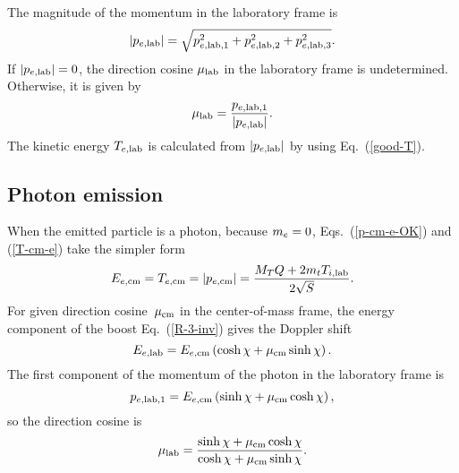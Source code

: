 {The magnitude of the momentum in the laboratory frame is
$$
  |p_{e,\textrm{lab}}| = \sqrt{ p_{e,\textrm{lab},1}^2 + p_{e,\textrm{lab},2}^2 + p_{e,\textrm{lab},3}^2 }.
$$
If $|p_{e,\textrm{lab}}| = 0$, the direction cosine $\mu_{\text{lab}}$ in the laboratory
frame is undetermined.  Otherwise, it is given by
$$
  \mu_{\text{lab}} = \frac{p_{e,\textrm{lab},1}}{|p_{e,\textrm{lab}}|}.
$$
The kinetic energy $T_{e,\textrm{lab}}$ is calculated from $|p_{e,\textrm{lab}}|$
by using Eq.~(\ref{good-T}).

\subsection{Photon emission}
When the emitted particle is a photon, because $m_e = 0$,
Eqs.~(\ref{p-cm-e-OK}) and (\ref{T-cm-e}) take the simpler form
$$
  E_{e, \textrm{cm}} = T_{e,\textrm{cm}} = |p_{e,\textrm{cm}}| =
   \frac{ M_T Q +  2m_t T_{i,\textrm{lab}} }
                {2 \sqrt{S} }.
$$
For given direction cosine~$\mu_{\text{cm}}$ in the center-of-mass frame,
the energy component of the boost Eq.~(\ref{R-3-inv}) gives the
Doppler shift
$$
   E_{e, \textrm{lab}} = E_{e, \textrm{cm}}
     \left( \cosh \chi + \mu_{\text{cm}} \sinh \chi \right).
$$
The first component of the momentum of the photon in the laboratory
frame is
$$
  p_{e,\textrm{lab},1} =  E_{e, \textrm{cm}}
     \left( \sinh \chi + \mu_{\text{cm}} \cosh \chi \right),
$$
so the direction cosine is
$$
  \mu_{\text{lab}} = \frac{\sinh \chi + \mu_{\text{cm}} \cosh \chi}
                {\cosh \chi + \mu_{\text{cm}} \sinh \chi}.
$$

\newcommand{\mayo}{m_{1,e}}
\newcommand{\mares}{m_{1,r}}
\newcommand{\mbyo}{m_{2,e}}
\newcommand{\mbres}{m_{2,r}}

\newcommand{\muacm}{\mu_{\text{1,cm}}}
\newcommand{\mubcm}{\mu_{\text{2,cm}}}
\newcommand{\mualab}{\mu_{\text{1,lab}}}
\newcommand{\mublab}{\mu_{\text{2,lab}}}

\newcommand{\Vacm}{\textbf{V}_{\text{1,cm}}}
\newcommand{\Valab}{\textbf{V}_{\text{1,lab}}}

\newcommand{\Talabe}{T_{1,e,\textrm{lab}}}
\newcommand{\Tacme}{T_{1,e,\textrm{cm}}}
\newcommand{\Tacmr}{T_{1,r,\textrm{cm}}}
\newcommand{\pacmi}{p_{1,i,\textrm{cm}}}
\newcommand{\pacme}{p_{1,e,\textrm{cm}}}
\newcommand{\pacmea}{p_{1,e,\textrm{cm},1}}
\newcommand{\pacmeb}{p_{1,e,\textrm{cm},2}}
\newcommand{\pacmec}{p_{1,e,\textrm{cm},3}}
\newcommand{\plabi}{p_{i,\textrm{lab}}}
\newcommand{\palabe}{p_{1,e,\textrm{lab}}}
\newcommand{\palabea}{p_{1,e,\textrm{lab},1}}
\newcommand{\palabeb}{p_{1,e,\textrm{lab},2}}
\newcommand{\palabec}{p_{1,e,\textrm{lab},3}}

\newcommand{\Tblabe}{T_{2,e,\textrm{lab}}}
\newcommand{\Tbcme}{T_{2,e,\textrm{cm}}}
\newcommand{\Tbcmr}{T_{2,r,\textrm{cm}}}
\newcommand{\pbcmi}{p_{2,i,\textrm{cm}}}
\newcommand{\pbcme}{p_{2,e,\textrm{cm}}}
\newcommand{\pbcmea}{p_{2,e,\textrm{cm},1}}
\newcommand{\pbcmeb}{p_{2,e,\textrm{cm},2}}
\newcommand{\pbcmec}{p_{2,e,\textrm{cm},3}}
\newcommand{\pbThetae}{p_{2,e,{\Theta_1}}}
\newcommand{\pbThetaea}{p_{2,e,{\Theta_1},1}}
\newcommand{\pbThetaeb}{p_{2,e,{\Theta_1},2}}
\newcommand{\pbThetaec}{p_{2,e,{\Theta_1},3}}
\newcommand{\pblabe}{p_{2,e,\textrm{lab}}}
\newcommand{\pblabea}{p_{2,e,\textrm{lab},1}}
\newcommand{\pblabeb}{p_{2,e,\textrm{lab},2}}
\newcommand{\pblabec}{p_{2,e,\textrm{lab},3}}

}
